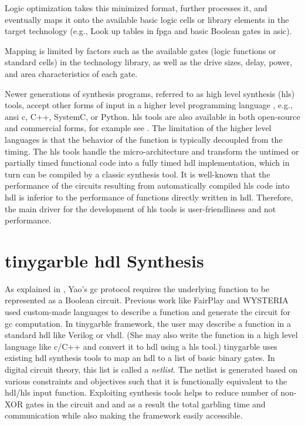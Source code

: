 Logic optimization takes this minimized format, further processes it, and eventually maps it onto the available basic logic cells or library elements in the target technology (e.g., Look up tables in \acrshort{fpga} and basic Boolean gates in \acrshort{asic}).

Mapping is limited by factors such as the available gates (logic functions or standard cells) in the technology library, as well as the drive sizes, delay, power, and area characteristics of each gate.

Newer generations of synthesis programs, referred to as high level synthesis (\acrshort{hls}) tools, accept other forms of input in a higher level programming language \cite{Chapter:Zhang2008,chu1989hyper,corazao1996performance}, e.g., \acrshort{ansi} \gls{c}, C++, SystemC, or Python.
\acrshort{hls} tools are also available in both open-source and commercial forms, for example see \cite{tool:Vivado,decaluwe2004myhdl,tool:PandA}.
The limitation of the higher level languages is that the behavior of the function is typically decoupled from the timing.
The \acrshort{hls} tools handle the micro-architecture and transform the untimed or partially timed functional code into a fully timed \acrshort{hdl} implementation, which in turn can be compiled by a classic synthesis tool.
It is well-known that the performance of the circuits resulting from automatically compiled \acrshort{hls} code into \acrshort{hdl} is inferior to the performance of functions directly written in \acrshort{hdl}.
Therefore, the main driver for the development of \acrshort{hls} tools is user-friendliness and not performance.

\section{\gls{tinygarble} \acrshort{hdl} Synthesis}\label{sec:syn-tiny}
As explained in , Yao's \acrshort{gc} protocol requires the underlying function to be represented as a Boolean circuit.
Previous work like FairPlay \cite{malkhi2004fairplay} and WYSTERIA \cite{rastogi2014wysteria} used custom-made languages to describe a function and generate the circuit for \acrshort{gc} computation.
In \gls{tinygarble} framework, the user may describe a function in a standard \acrshort{hdl} like Verilog or \gls{vhdl}.
(She may also write the function in a high level language like \gls{c}/C++ and convert it to \acrshort{hdl} using a \acrshort{hls} tool.)
\gls{tinygarble} uses existing \acrshort{hdl} synthesis tools to map an \acrshort{hdl} to a list of basic binary gates.
In digital circuit theory, this list is called a \emph{netlist}.
The netlist is generated based on various constraints and objectives such that it is functionally equivalent to the \acrshort{hdl}/\acrshort{hls} input function.
Exploiting synthesis tools helps to reduce number of non-XOR gates in the circuit and and as a result the total garbling time and communication while also making the framework easily accessible.

